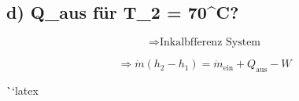 \subsection*{d) Q\_aus für T_2 = 70^\circ C?}

\[
\Rightarrow \text{Inkalbfferenz System}
\]

\[
\Rightarrow \dot{m} (h_2 - h_1) = \dot{m}_{\text{ein}} + Q_{\text{aus}} - W
\]

\```latex